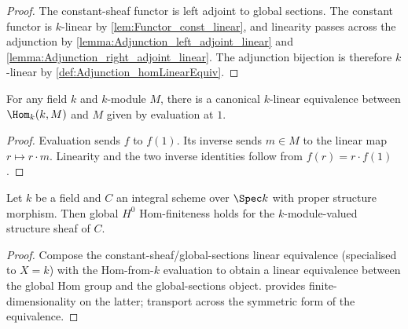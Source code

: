 \begin{proof}
  \leanok
  The constant-sheaf functor is left adjoint to global sections. The constant functor is \(k\)-linear by \cref{lem:Functor_const_linear}, and linearity passes across the adjunction by \cref{lemma:Adjunction_left_adjoint_linear} and \cref{lemma:Adjunction_right_adjoint_linear}. The adjunction bijection is therefore \(k\)-linear by \cref{def:Adjunction_homLinearEquiv}.
\end{proof}

\begin{theorem}\leanok
  \label{def:Scheme_homFromOne_linearEquiv}
  For any field \(k\) and \(k\)-module \(M\), there is a canonical \(k\)-linear equivalence between \(\Hom_k(k, M)\) and \(M\) given by evaluation at \(1\).
\end{theorem}

\begin{proof}
  \leanok
  Evaluation sends \(f\) to \(f(1)\). Its inverse sends \(m\in M\) to the linear map \(r\mapsto r\cdot m\). Linearity and the two inverse identities follow from \(f(r)=r\cdot f(1)\).
\end{proof}

\begin{theorem}\leanok
  \label{inst:Scheme_instIsHModuleHomFinite_toModuleKSheaf}
  Let \(k\) be a field and \(C\) an integral scheme over \(\Spec k\) with proper structure morphism. Then global \(H^0\) Hom-finiteness holds for the \(k\)-module-valued structure sheaf of \(C\).
\end{theorem}

\begin{proof}

  \leanok
  Compose the constant-sheaf/global-sections linear equivalence (specialised to \(X = k\)) with the Hom-from-\(k\) evaluation to obtain a linear equivalence between the global Hom group and the global-sections object.  provides finite-dimensionality on the latter; transport across the symmetric form of the equivalence.
\end{proof}


